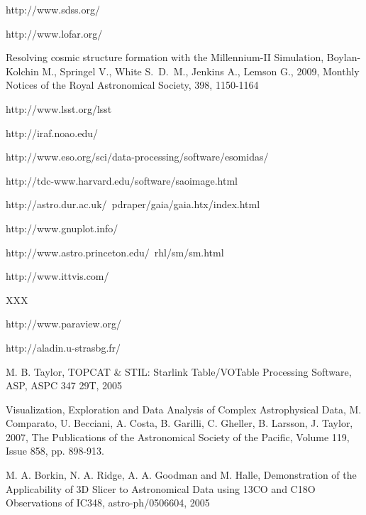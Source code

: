 \begin{thebibliography}{00}

%
%





 http://www.sdss.org/

 http://www.lofar.org/

 Resolving cosmic structure formation with the Millennium-II Simulation,
Boylan-Kolchin M., Springel V., White S.~D.~M., Jenkins A., Lemson G., 2009, Monthly Notices of the Royal Astronomical Society, 398, 1150-1164

http://www.lsst.org/lsst

 http://iraf.noao.edu/

 http://www.eso.org/sci/data-processing/software/esomidas/

 http://tdc-www.harvard.edu/software/saoimage.html

 http://astro.dur.ac.uk/~pdraper/gaia/gaia.htx/index.html

 http://www.gnuplot.info/

 http://www.astro.princeton.edu/~rhl/sm/sm.html

 http://www.ittvis.com/

 XXX

 http://www.paraview.org/

 http://aladin.u-strasbg.fr/

 M. B. Taylor, TOPCAT \& STIL: Starlink Table/VOTable Processing Software, ASP, ASPC 347 29T, 2005

Visualization, Exploration and Data Analysis of Complex Astrophysical Data,
M. Comparato, U. Becciani, A. Costa, B. Garilli, C. Gheller, B. Larsson, J. Taylor, 2007, 
The Publications of the Astronomical Society of the Pacific, Volume 119, Issue 858, pp. 898-913.

 M. A. Borkin, N. A. Ridge, A. A. Goodman and M. Halle, Demonstration of the Applicability of 3D Slicer to Astronomical Data using 13CO and C18O Observations of IC348, astro-ph/0506604, 2005


\end{thebibliography}
